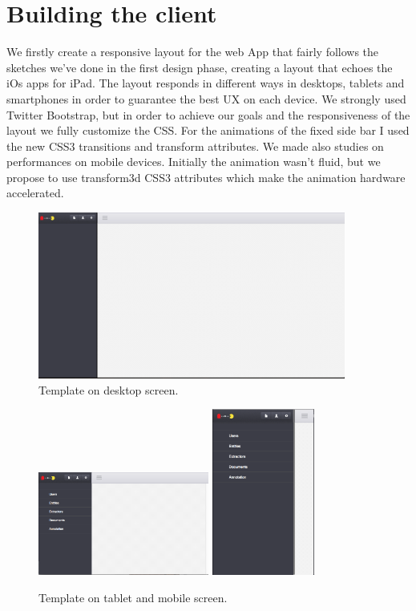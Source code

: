 \documentclass[a4paper,13pt]{report}
\begin{document}
\section{Building the client}
We firstly create a responsive layout for the web App that fairly follows the sketches we've done in the first design phase, creating a layout that echoes the iOs  apps for iPad.
The layout responds in different ways in desktops, tablets and smartphones in order to guarantee the best UX on each device.
We strongly used Twitter Bootstrap, but in order to achieve our goals and the responsiveness of the layout we fully customize the CSS.
For the animations of the fixed side bar I used the new CSS3 transitions and transform attributes.
We made also studies on performances on mobile devices. Initially the animation wasn't fluid, but we propose to use transform3d CSS3 attributes which make the animation hardware accelerated.
\begin{figure}[H]
  \caption{Template on desktop screen.}
  \centering
    \includegraphics[width=0.9\textwidth]{pics/proto/desktopEmpty}
\end{figure}\begin{figure}[H]
  \caption{Template on tablet  and mobile screen.}
  \centering
    \includegraphics[width=0.5\textwidth]{pics/proto/tabletEmpty}
    \includegraphics[width=0.3\textwidth]{pics/proto/mobileEmpty}
\end{figure}
\end{document}
